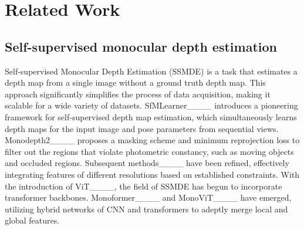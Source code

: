 \section{Related Work}
\label{sec:related_work}

\subsection{Self-supervised monocular depth estimation}
\label{sec:rel_selsupmono}
Self-supervised Monocular Depth Estimation (SSMDE) is a task that estimates a depth map from a single image without a ground truth depth map.
This approach significantly simplifies the process of data acquisition, making it scalable for a wide variety of datasets. 
SfMLearner____ introduces a pioneering framework for self-supervised depth map estimation, which simultaneously learns depth maps for the input image and pose parameters from sequential views.
Monodepth2____ proposes a masking scheme and minimum reprojection loss to filter out the regions that violate photometric constancy, such as moving objects and occluded regions.
Subsequent methods____ have been refined, effectively integrating features of different resolutions based on established constraints.
With the introduction of ViT____, the field of SSMDE has begun to incorporate transformer backbones. 
Monoformer____ and MonoViT____ have emerged, utilizing hybrid networks of CNN and transformers to adeptly merge local and global features.

